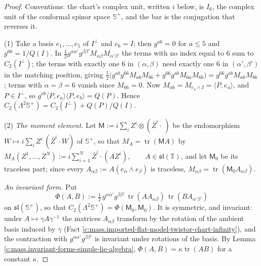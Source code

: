 \documentclass[11pt]{article}
\theoremstyle{definition}
\theoremstyle{plain}
\providecommand{\CS}{}\renewcommand{\CS}{{\mathbb{S}^{+}}}
\providecommand{\T}{}\renewcommand{\T}{\mathbb{T}}
\providecommand{\tr}{}\renewcommand{\tr}{\operatorname{tr}}
\providecommand{\ip}{}\renewcommand{\ip}[2]{\langle #1, #2\rangle}
\begin{document}
\begin{proof}
Conventions: the chart's complex unit, written $i$ below, is $I_{6}$, the complex unit of the conformal spinor space $\CS$, and the bar is the conjugation that reverses it.

(1) Take a basis $e_{1}, \dots, e_{5}$ of $I^{\perp}$ and $e_{6} = I$; then $g^{a6} = 0$ for $a \le 5$ and $g^{66} = 1/Q(I)$. In $\tfrac12 g^{\alpha\alpha'}g^{\beta\beta'}M_{\alpha\beta}M_{\alpha'\beta'}$ the terms with no index equal to $6$ sum to $C_{2}(I^{\perp})$; the terms with exactly one $6$ in $(\alpha,\beta)$ need exactly one $6$ in $(\alpha',\beta')$ in the matching position, giving $\tfrac12\bigl(g^{ab}g^{66}M_{a6}M_{b6} + g^{66}g^{ab}M_{6a}M_{6b}\bigr) = g^{66}g^{ab}M_{a6}M_{b6}$; terms with $\alpha = \beta = 6$ vanish since $M_{66} = 0$. Now $M_{a6} = M_{e_{a}\wedge I} = \ip{P}{e_{a}}$, and $P \in I^{\perp}$, so $g^{ab}\ip{P}{e_{a}}\ip{P}{e_{b}} = Q(P)$. Hence $C_{2}(\Lambda^{2}\CS) = C_{2}(I^{\perp}) + Q(P)/Q(I)$.

(2) \emph{The moment element.} Let $\mathsf{M} := i\sum_{i}Z^{i}\otimes(\bar{Z}^{i}\cdot\,)$ be the endomorphism $W \mapsto i\sum_{i}Z^{i}\,(\bar{Z}^{i}\cdot W)$ of $\CS$, so that $M_{A} = \tr(\mathsf{M}A)$ by $M_{A}(Z^{1}, \dots, Z^{N}) := i\sum_{i=1}^{N} \bar{Z}^{i}\cdot(A Z^{i}), \qquad A \in \mathfrak{sl}(\T)$, and let $\mathsf{M}_{0}$ be its traceless part; since every $A_{\alpha\beta} := A(e_{\alpha}\wedge e_{\beta})$ is traceless, $M_{\alpha\beta} = \tr(\mathsf{M}_{0}A_{\alpha\beta})$.

\emph{An invariant form.} Put
\[
\Phi(A, B) := \tfrac12\, g^{\alpha\alpha'}g^{\beta\beta'}\,\tr(AA_{\alpha\beta})\,\tr(BA_{\alpha'\beta'})
\]
on $\mathfrak{sl}(\CS)$, so that $C_{2}(\Lambda^{2}\CS) = \Phi(\mathsf{M}_{0}, \mathsf{M}_{0})$. It is symmetric, and invariant: under $A \mapsto \gamma A\gamma^{-1}$ the matrices $A_{\alpha\beta}$ transform by the rotation of the ambient basis induced by $\gamma$ (Fact \ref{c:mass.imported-flat-model-twistor-chart-infinity}), and the contraction with $g^{\alpha\alpha'}g^{\beta\beta'}$ is invariant under rotations of the basis. By Lemma \ref{c:mass.invariant-forms-simple-lie-algebra}, $\Phi(A,B) = \kappa\tr(AB)$ for a constant $\kappa$.


\end{proof}
\end{document}
